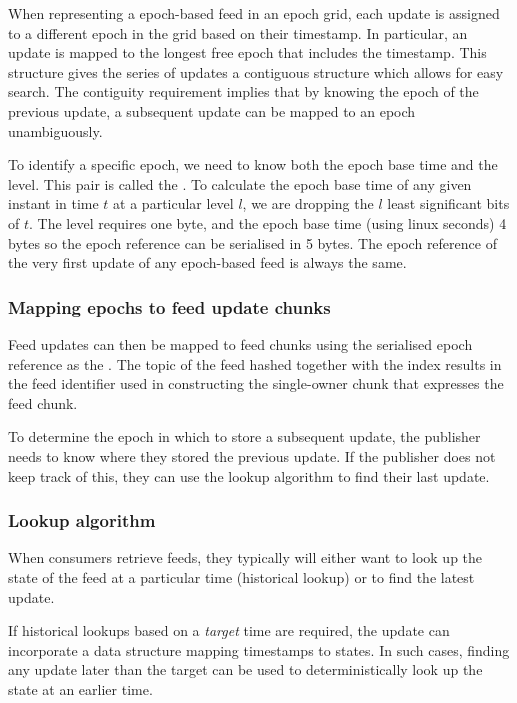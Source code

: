 When representing a epoch-based feed in an epoch grid, each update is assigned to a different epoch in the grid based on their timestamp. In particular, an update is mapped to the longest free epoch that includes the timestamp. This structure gives the series of updates a contiguous structure which allows for easy search. The contiguity requirement implies that by knowing the epoch of the previous update, a subsequent update can be mapped to an epoch unambiguously.


To identify a specific epoch, we need to know both the epoch base time and the level. This pair is called the  . To calculate the epoch base time of any given instant in time $t$ at a particular level $l$, we are dropping the $l$ least significant bits of $t$. 
The level requires one byte, and the epoch base time (using linux seconds) 4 bytes so the epoch reference can be serialised in 5 bytes. 
The epoch reference of the very first update of any epoch-based feed is always the same.

\subsubsection{Mapping epochs to feed update chunks}

Feed updates can then be mapped to feed chunks using the serialised epoch reference as the . The topic of the feed hashed together with the index results in the feed identifier used in constructing the single-owner chunk that expresses the feed chunk. 

To determine the epoch in which to store a subsequent update, the publisher needs to know where they stored the previous update. If the publisher does not keep track of this, they can use the lookup algorithm to find their last update.



\subsubsection{Lookup algorithm}

When consumers retrieve feeds, they typically will either want to look up the state of the feed at a particular time (historical lookup) or to find the latest update.

If historical lookups based on a \emph{target} time are required, the update can incorporate a data structure mapping timestamps to states. In such cases, finding any update later than the target can be used to deterministically look up the state at an earlier time. 

